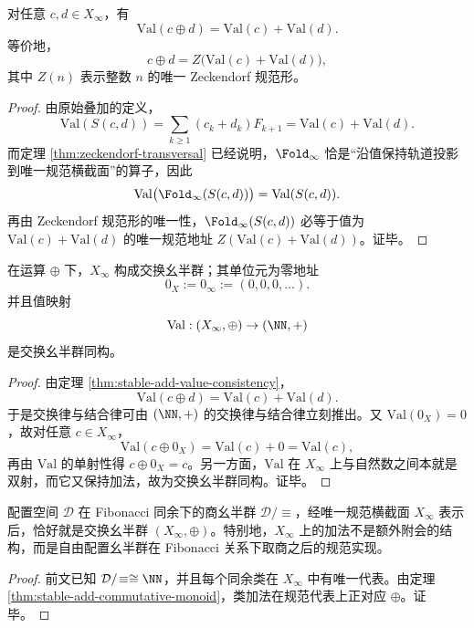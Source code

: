 \begin{theorem}[稳定加法与值拉回的一致性]\label{thm:stable-add-value-consistency}
对任意 \(c,d\in X_\infty\)，有
\[
\mathrm{Val}(c\oplus d)=\mathrm{Val}(c)+\mathrm{Val}(d).
\]
等价地，
\[
c\oplus d
=
Z\bigl(\mathrm{Val}(c)+\mathrm{Val}(d)\bigr),
\]
其中 \(Z(n)\) 表示整数 \(n\) 的唯一 Zeckendorf 规范形。
\end{theorem}
\begin{proof}
由原始叠加的定义，
\[
\mathrm{Val}(S(c,d))
=
\sum_{k\ge 1}(c_k+d_k)F_{k+1}
=
\mathrm{Val}(c)+\mathrm{Val}(d).
\]
而定理 \ref{thm:zeckendorf-transversal} 已经说明，\(\Fold_\infty\) 恰是“沿值保持轨道投影到唯一规范横截面”的算子，因此
\[
\mathrm{Val}\bigl(\Fold_\infty(S(c,d))\bigr)=\mathrm{Val}(S(c,d)).
\]
再由 Zeckendorf 规范形的唯一性，\(\Fold_\infty(S(c,d))\) 必等于值为 \(\mathrm{Val}(c)+\mathrm{Val}(d)\) 的唯一规范地址 \(Z(\mathrm{Val}(c)+\mathrm{Val}(d))\)。证毕。
\end{proof}

\begin{theorem}[交换幺半群结构]\label{thm:stable-add-commutative-monoid}
在运算 \(\oplus\) 下，\(X_\infty\) 构成交换幺半群；其单位元为零地址
\[
0_X:=0_\infty:=(0,0,0,\dots).
\]
并且值映射
\[
\mathrm{Val}:(X_\infty,\oplus)\to (\NN,+)
\]
是交换幺半群同构。
\end{theorem}
\begin{proof}
由定理 \ref{thm:stable-add-value-consistency}，
\[
\mathrm{Val}(c\oplus d)=\mathrm{Val}(c)+\mathrm{Val}(d).
\]
于是交换律与结合律可由 \((\NN,+)\) 的交换律与结合律立刻推出。又 \(\mathrm{Val}(0_X)=0\)，故对任意 \(c\in X_\infty\)，
\[
\mathrm{Val}(c\oplus 0_X)=\mathrm{Val}(c)+0=\mathrm{Val}(c),
\]
再由 \(\mathrm{Val}\) 的单射性得 \(c\oplus 0_X=c\)。另一方面，\(\mathrm{Val}\) 在 \(X_\infty\) 上与自然数之间本就是双射，而它又保持加法，故为交换幺半群同构。证毕。
\end{proof}

\begin{corollary}[规范横截面上的商幺半群实现]
配置空间 \(\mathcal D\) 在 Fibonacci 同余下的商幺半群 \(\mathcal D/\!\equiv\)，经唯一规范横截面 \(X_\infty\) 表示后，恰好就是交换幺半群 \((X_\infty,\oplus)\)。特别地，\(X_\infty\) 上的加法不是额外附会的结构，而是自由配置幺半群在 Fibonacci 关系下取商之后的规范实现。
\end{corollary}
\begin{proof}
前文已知 \(\mathcal D/\!\equiv\cong \NN\)，并且每个同余类在 \(X_\infty\) 中有唯一代表。由定理 \ref{thm:stable-add-commutative-monoid}，类加法在规范代表上正对应 \(\oplus\)。证毕。
\end{proof}

